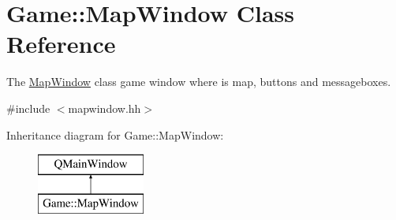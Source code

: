\hypertarget{class_game_1_1_map_window}{\section{Game\-:\-:Map\-Window Class Reference}
\label{class_game_1_1_map_window}
}


The \hyperlink{class_game_1_1_map_window}{Map\-Window} class game window where is map, buttons and messageboxes.  




{\ttfamily \#include $<$mapwindow.\-hh$>$}

Inheritance diagram for Game\-:\-:Map\-Window\-:\begin{figure}[H]
\begin{center}
\leavevmode
\includegraphics[height=2.000000cm]{class_game_1_1_map_window}
\end{center}
\end{figure}

